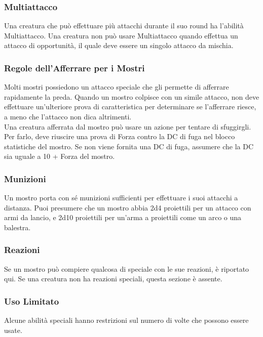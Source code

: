 \subsubsection{Multiattacco}

Una creatura che può effettuare più attacchi durante il suo round ha l'abilità Multiattacco. Una creatura non può usare Multiattacco quando effettua un attacco di opportunità, il quale deve essere un singolo attacco da mischia.

\subsubsection{Regole dell'Afferrare per i Mostri}

Molti mostri possiedono un attacco speciale che gli permette di afferrare rapidamente la preda. Quando un mostro colpisce con un simile attacco, non deve effettuare un'ulteriore prova di caratteristica per determinare se l'afferrare riesce, a meno che l'attacco non dica altrimenti.\\
Una creatura afferrata dal mostro può usare un azione per tentare di sfuggirgli. Per farlo, deve riuscire una prova di Forza contro la DC di fuga nel blocco statistiche del mostro. Se non viene fornita una DC di fuga, assumere che la DC sia uguale a 10 + Forza del mostro.

\subsubsection{Munizioni}

Un mostro porta con sé munizioni sufficienti per effettuare i suoi attacchi a distanza. Puoi presumere che un mostro abbia 2d4 proiettili per un attacco con armi da lancio, e 2d10 proiettili per un'arma a proiettili come un arco o una balestra.

\subsubsection{Reazioni}

Se un mostro può compiere qualcosa di speciale con le sue reazioni, è riportato qui. Se una creatura non ha reazioni speciali, questa sezione è assente.

\subsubsection{Uso Limitato}

Alcune abilità speciali hanno restrizioni sul numero di volte che
possono essere usate.

